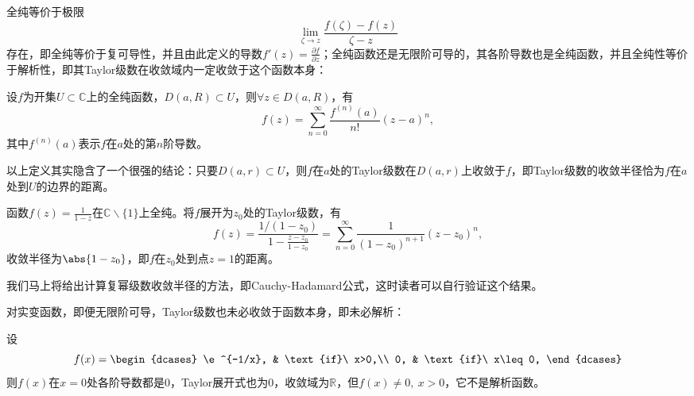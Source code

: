 全纯等价于极限
\begin{equation}
    \lim_{\zeta\to z}\frac{f(\zeta)-f(z)}{\zeta-z}
\end{equation}
存在，即全纯等价于复可导性，并且由此定义的导数$\displaystyle f'(z)=\frac{\partial f}{\partial z}$；全纯函数还是无限阶可导的，其各阶导数也是全纯函数，并且全纯性等价于解析性，即其Taylor级数在收敛域内一定收敛于这个函数本身：
\begin{definition}[复变函数的Taylor级数展开]
    设$f$为开集$U\subset\mathbb{C}$上的全纯函数，$D(a,R)\subset U$，则$\forall z\in D(a,R)$，有
    \begin{equation}
        f(z)=\sum_{n=0}^{\infty}\frac{f^{(n)}(a)}{n!}(z-a)^n,
    \end{equation}
    其中$f^{(n)}(a)$表示$f$在$a$处的第$n$阶导数。
\end{definition}

以上定义其实隐含了一个很强的结论：只要$D(a,r)\subset U$，则$f$在$a$处的Taylor级数在$D(a,r)$上收敛于$f$，即Taylor级数的收敛半径恰为$f$在$a$处到$U$的边界的距离。
\begin{example}
    函数$\displaystyle f(z)=\frac{1}{1-z}$在$\mathbb{C}\backslash\{1\}$上全纯。将$f$展开为$z_0$处的Taylor级数，有
    \begin{equation}
        f(z)=\frac{1/(1-z_0)}{1-\frac{z-z_0}{1-z_0}}=\sum_{n=0}^{\infty}\frac{1}{(1-z_0)^{n+1}}(z-z_0)^n,
    \end{equation}
    收敛半径为$\abs{1-z_0}$，即$f$在$z_0$处到点$z=1$的距离。

    我们马上将给出计算复幂级数收敛半径的方法，即Cauchy-Hadamard公式，这时读者可以自行验证这个结果。
\end{example}

对实变函数，即便无限阶可导，Taylor级数也未必收敛于函数本身，即未必解析：
\begin{example}
    设
    \begin{equation}
        f(x)=\begin{dcases}
            \e^{-1/x}, & \text{if}\ x>0,\\
            0, & \text{if}\ x\leq 0,
        \end{dcases}
    \end{equation}
    则$f(x)$在$x=0$处各阶导数都是$0$，Taylor展开式也为$0$，收敛域为$\mathbb{R}$，但$f(x)\neq 0,\ x>0$，它不是解析函数。
\end{example}

